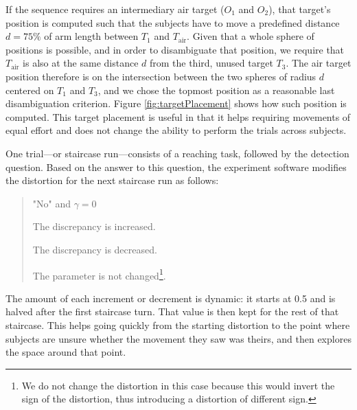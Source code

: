 If the sequence requires an intermediary air target ($O_1$ and $O_2$), that target's position is computed such that the subjects have to move a predefined distance $d = 75\%$ of arm length between $T_1$ and $T_{\text{air}}$. Given that a whole sphere of positions is possible, and in order to disambiguate that position, we require that $T_\text{air}$ is also at the same distance $d$ from the third, unused target $T_3$. The air target position therefore is on the intersection between the two spheres of radius $d$ centered on $T_1$ and $T_3$, and we chose the topmost position as a reasonable last disambiguation criterion. Figure \ref{fig:targetPlacement} shows how such position is computed. This target placement is useful in that it helps requiring movements of equal effort and does not change the ability to perform the trials across subjects.

One trial---or staircase run---consists of a reaching task, followed by the detection question. Based on the answer to this question, the experiment software modifies the distortion for the next staircase run as follows:
\begin{quote}
    \begin{labeling}{"No" and $\gamma = 0$}
      \item ["Yes"] The discrepancy is increased.
      \item ["No" and $\gamma \neq 0$] The discrepancy is decreased.
      \item ["No" and $\gamma = 0$] The parameter is not changed\footnote{We do not change the distortion in this case because this would invert the sign of the distortion, thus introducing a distortion of different sign.}.
    \end{labeling}
\end{quote}

The amount of each increment or decrement is dynamic: it starts at \num{0.5} and is halved after the first staircase turn. That value is then kept for the rest of that staircase. This helps going quickly from the starting distortion to the point where subjects are unsure whether the movement they saw was theirs, and then explores the space around that point.

